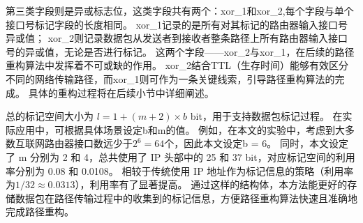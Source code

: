 第三类字段则是异或标志位，这类字段共有两个：xor\_1和xor\_2,每个字段与单个接口号标记字段的长度相同。
xor\_1记录的是所有对其标记的路由器输入接口号异或值；
xor\_2则记录数据包从发送者到接收者整条路径上所有路由器输入接口号的异或值，无论是否进行标记。
这两个字段——xor\_2与xor\_1，在后续的路径重构算法中发挥着不可或缺的作用。
xor\_2结合TTL（生存时间）能够有效区分不同的网络传输路径，而xor\_1则可作为一条关键线索，引导路径重构算法的完成。
具体的重构过程将在后续小节中详细阐述。\par

总的标记空间大小为 $l = 1 + (m + 2) \times b$ bit，用于支持数据包标记过程。
在实际应用中，可根据具体场景设定b和m的值。
例如，在本文的实验中，考虑到大多数互联网路由器接口数远少于$2^6 =64$个，因此本文设定b = 6。
同时，本文设定了 m 分别为 2 和 4，总共使用了 IP 头部中的 25 和 37 bit，对应标记空间的利用率分别为 0.08 和 0.0108。
相较于传统使用 IP 地址作为标记信息的策略（利用率为$1/32 \approx 0.0313$），利用率有了显著提高。
通过这样的结构体，本方法能更好的存储数据包在路径传输过程中的收集到的标记信息，方便路径重构算法快速且准确地完成路径重构。\par

